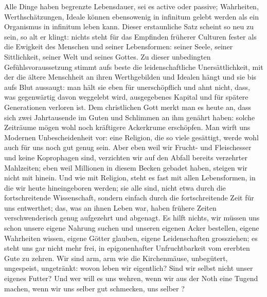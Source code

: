 Alle Dinge haben begrenzte Lebensdauer, sei es active oder passive; Wahrheiten, Werthschätzungen, Ideale können ebensowenig in infinitum gelebt werden als ein Organismus in infinitum leben kann. Dieser erstaunliche Satz scheint so neu zu sein, so alt er klingt: nichts steht für das Empfinden früherer Culturen fester als die Ewigkeit des Menschen und seiner Lebensformen: seiner Seele, seiner Sittlichkeit, seiner Welt und seines Gottes. Zu dieser unbedingten Gefühlsvoraussetzung stimmt aufs beste die leidenschaftliche Unersättlichkeit, mit der die ältere Menschheit an ihren Werthgebilden und Idealen hängt und sie bis aufs Blut aussaugt: man hält sie eben für unerschöpflich und ahnt nicht, dass, was gegenwärtig davon weggelebt wird, ausgegebenes Kapital und für spätere Generationen verloren ist. Dem christlichen Gott merkt man es heute an, dass sich zwei Jahrtausende im Guten und Schlimmen an ihm genährt haben: solche Zeiträume mögen wohl noch kräftigere Ackerkrume erschöpfen. Man wirft uns Modernen Unbescheidenheit vor: eine Religion, die so viele gesättigt, werde wohl auch für uns noch gut genug sein. Aber eben weil wir Frucht- und Fleischesser und keine Koprophagen sind, verzichten wir auf den Abfall bereits verzehrter Mahlzeiten; eben weil Millionen in diesem Becken gebadet haben, steigen wir nicht mit hinein. Und wie mit Religion, steht es fast mit allen Lebensformen, in die wir heute hineingeboren werden; sie alle sind, nicht etwa durch die fortschreitende Wissenschaft, sondern einfach durch die fortschreitende Zeit für uns entwerthet; das, was an ihnen Leben war, haben frühere Zeiten verschwenderisch genug aufgezehrt und abgenagt. Es hilft nichts, wir müssen uns schon unsere eigene Nahrung suchen und unseren eigenen Acker bestellen, eigene Wahrheiten wissen, eigene Götter glauben, eigene Leidenschaften grossziehen; es steht uns gar nicht mehr frei, in epigonenhafter Unfruchtbarkeit vom ererbten Gute zu zehren. Wir sind arm, arm wie die Kirchenmäuse, unbegütert, ungespeist, ungetränkt: wovon leben wir eigentlich? Sind wir selbst nicht unser eigenes Futter? Und wer will es uns wehren, wenn wir aus der Noth eine Tugend machen, wenn wir uns selber gut schmecken, uns selber ?
\par

